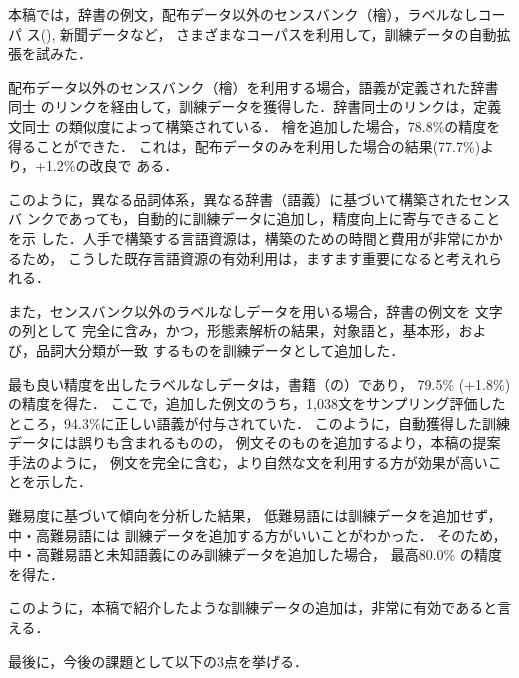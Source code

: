 \documentclass[japanese]{jnlp_1.4}
\newcommand{\BK}{}
\newcommand{\bccwj}{}
\begin{document}
本稿では，辞書の例文，配布データ以外のセンスバンク（檜），ラベルなしコーパ
ス(\bccwj), 新聞データなど，
さまざまなコーパスを利用して，訓練データの自動拡張を試みた．

配布データ以外のセンスバンク（檜）を利用する場合，語義が定義された辞書同士
のリンクを経由して，訓練データを獲得した．辞書同士のリンクは，定義文同士
の類似度によって構築されている．
檜を追加した場合，78.8\%の精度を得ることができた．
これは，配布データのみを利用した場合の結果(77.7\%)より，+1.2\%の改良で
ある．

このように，異なる品詞体系，異なる辞書（語義）に基づいて構築されたセンスバ
ンクであっても，自動的に訓練データに追加し，精度向上に寄与できることを示
した．人手で構築する言語資源は，構築のための時間と費用が非常にかかるため，
こうした既存言語資源の有効利用は，ますます重要になると考えれられる．


また，センスバンク以外のラベルなしデータを用いる場合，辞書の例文を
文字の列として
完全に含み，かつ，形態素解析の結果，対象語と，基本形，および，品詞大分類が一致
するものを訓練データとして追加した．

最も良い精度を出したラベルなしデータは，書籍（\bccwj{}の\BK{}）であり，
79.5\% (+1.8\%) の精度を得た．
ここで，追加した例文のうち，1,038文をサンプリング評価したところ，94.3\%に正しい語義が付与されていた．
このように，自動獲得した訓練データには誤りも含まれるものの，
例文そのものを追加するより，本稿の提案手法のように，
例文を完全に含む，より自然な文を利用する方が効果が高いことを示した．


難易度に基づいて傾向を分析した結果，
低難易語には訓練データを追加せず，中・高難易語には
訓練データを追加する方がいいことがわかった．
そのため，中・高難易語と未知語義にのみ訓練データを追加した場合，
最高80.0\% の精度を得た．



このように，本稿で紹介したような訓練データの追加は，非常に有効であると言
える．

最後に，今後の課題として以下の3点を挙げる．
\end{document}
